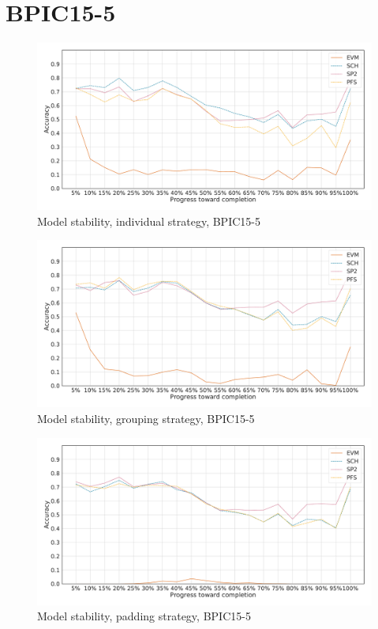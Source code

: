 \section*{BPIC15-5}
\begin{figure}[!htb]
    \centering
    \includegraphics[width=\textwidth]{gfx/bpic2015_5/individual_stability.pdf}
    \caption{Model stability, individual strategy, BPIC15-5}
    \label{fig:bpic15-5-individual-stability}
\end{figure}
\begin{figure}[!htb]
    \centering
    \includegraphics[width=\textwidth]{gfx/bpic2015_5/grouped_stability.pdf}
    \caption{Model stability, grouping strategy, BPIC15-5}
    \label{fig:bpic15-5-grouped-stability}
\end{figure}
\begin{figure}[!htb]
    \centering
    \includegraphics[width=\textwidth]{gfx/bpic2015_5/padded_stability.pdf}
    \caption{Model stability, padding strategy, BPIC15-5}
    \label{fig:bpic15-5-padded-stability}
\end{figure}

